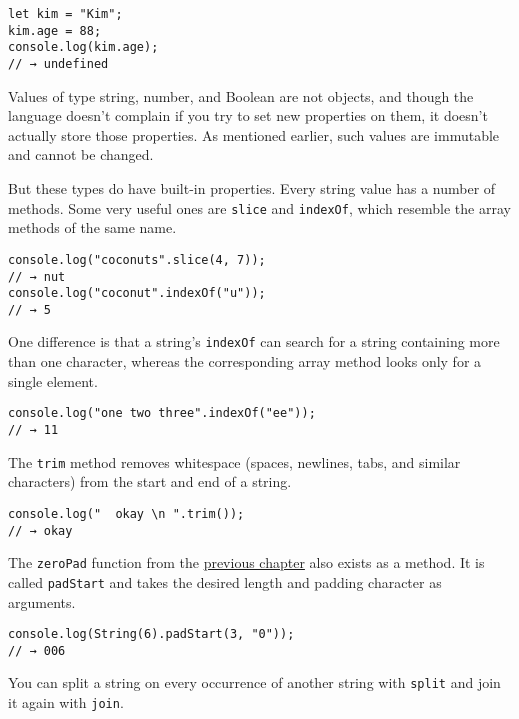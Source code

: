 \begin{lstlisting}
let kim = "Kim";
kim.age = 88;
console.log(kim.age);
// → undefined
\end{lstlisting}
\noindent

Values of type string, number, and Boolean are not objects, and though the language doesn't complain if you try to set new properties on them, it doesn't actually store those properties. As mentioned earlier, such values are immutable and cannot be changed.

But these types do have built-in properties. Every string value has a number of methods. Some very useful ones are \lstinline`slice` and \lstinline`indexOf`, which resemble the array methods of the same name.

\begin{lstlisting}
console.log("coconuts".slice(4, 7));
// → nut
console.log("coconut".indexOf("u"));
// → 5
\end{lstlisting}
\noindent

One difference is that a string's \lstinline`indexOf` can search for a string containing more than one character, whereas the corresponding array method looks only for a single element.

\begin{lstlisting}
console.log("one two three".indexOf("ee"));
// → 11
\end{lstlisting}
\noindent{}

The \lstinline`trim` method removes whitespace (spaces, newlines, tabs, and similar characters) from the start and end of a string.

\begin{lstlisting}
console.log("  okay \n ".trim());
// → okay
\end{lstlisting}
\noindent

The \lstinline`zeroPad` function from the \hyperref[functions]{previous chapter} also exists as a method. It is called \lstinline`padStart` and takes the desired length and padding character as arguments.

\begin{lstlisting}
console.log(String(6).padStart(3, "0"));
// → 006
\end{lstlisting}
\noindent

\label{data.split}You can split a string on every occurrence of another string with \lstinline`split` and join it again with \lstinline`join`.

